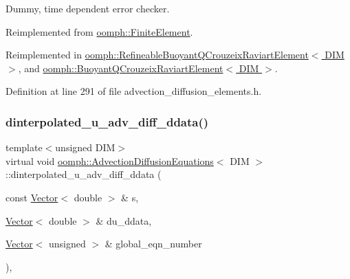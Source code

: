 Dummy, time dependent error checker. 



Reimplemented from \hyperlink{classoomph_1_1FiniteElement_a7f67853506dc73fa6b7505108de22d1f}{oomph\+::\+Finite\+Element}.



Reimplemented in \hyperlink{classoomph_1_1RefineableBuoyantQCrouzeixRaviartElement_ad239e9a0ebe88136d68e1521fc51e0bb}{oomph\+::\+Refineable\+Buoyant\+Q\+Crouzeix\+Raviart\+Element$<$ D\+I\+M $>$}, and \hyperlink{classoomph_1_1BuoyantQCrouzeixRaviartElement_a53d343548b707c62e9f11a04d2dda986}{oomph\+::\+Buoyant\+Q\+Crouzeix\+Raviart\+Element$<$ D\+I\+M $>$}.



Definition at line 291 of file advection\+\_\+diffusion\+\_\+elements.\+h.

\mbox{\label{classoomph_1_1AdvectionDiffusionEquations_a7b264e70255fa420e443e60cbd8d7dbc}} 
\subsubsection{\texorpdfstring{dinterpolated\+\_\+u\+\_\+adv\+\_\+diff\+\_\+ddata()}{dinterpolated\_u\_adv\_diff\_ddata()}}
{\footnotesize\ttfamily template$<$unsigned D\+IM$>$ \\
virtual void \hyperlink{classoomph_1_1AdvectionDiffusionEquations}{oomph\+::\+Advection\+Diffusion\+Equations}$<$ D\+IM $>$\+::dinterpolated\+\_\+u\+\_\+adv\+\_\+diff\+\_\+ddata (\begin{DoxyParamCaption}\item[{const \hyperlink{classoomph_1_1Vector}{Vector}$<$ double $>$ \&}]{s,  }\item[{\hyperlink{classoomph_1_1Vector}{Vector}$<$ double $>$ \&}]{du\+\_\+ddata,  }\item[{\hyperlink{classoomph_1_1Vector}{Vector}$<$ unsigned $>$ \&}]{global\+\_\+eqn\+\_\+number }\end{DoxyParamCaption})\hspace{0.3cm}{\ttfamily [inline]}, {\ttfamily [virtual]}}



